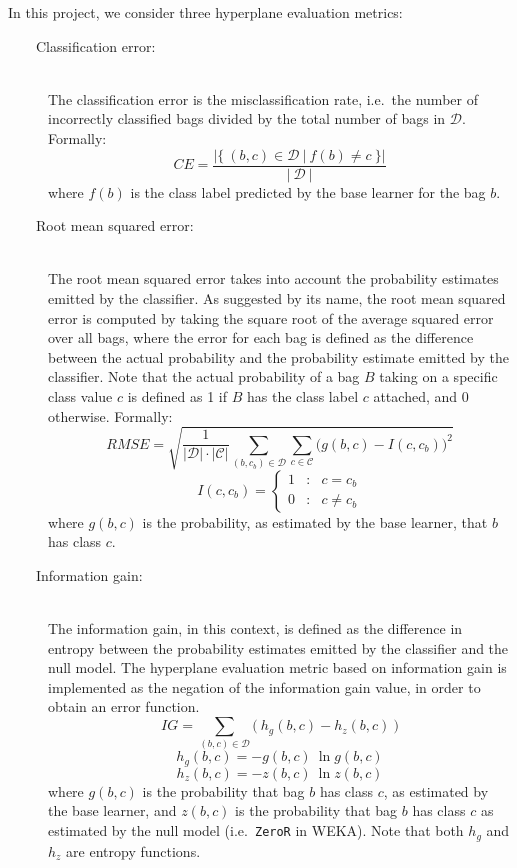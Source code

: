\documentclass[a4paper,12pt]{report} %
\newcommand{\mcl}[1]{\mathcal{#1}}
\begin{document}
In this project, we consider three hyperplane evaluation metrics:
\begin{description}
\item[~~~~Classification error:]  \ \\
	The classification error is the misclassification rate, 
	i.e.\ the number of incorrectly classified bags divided by the total number of bags in $\mcl{D}$.
	Formally:
	$$
		CE = \frac{| \{~ (b,c) \in \mcl{D} ~|~ f(b) \neq c ~\} | }{|~\mcl{D}~|}
	$$
	where $f(b)$ is the class label predicted by the base learner for the bag $b$.\\
	
\item[~~~~Root mean squared error:]  \ \\
	The root mean squared error takes into account the 
	probability estimates emitted by the classifier. 
	As suggested by its name, the root mean squared error is computed by 
		taking the square root of the average squared error over all bags,
		where the error for each bag is defined as the difference between the 
		actual probability and the probability estimate emitted by the classifier.
	Note that the actual probability of a bag $B$ taking on a specific class value $c$ is defined 
		as 1 if $B$ has the class label $c$ attached, and 0 otherwise.
	Formally:
	$$		
		RMSE = \sqrt{\frac{1}{|\mcl{D}| \cdot |\mcl{C}|} 
			\sum_{(b,c_b)\in\mcl{D}} \sum_{c\in\mcl{C}}
			\Big( g(b,c) - I(c,c_b) \Big)^2}
	$$
	$$
		I(c,c_b) = \left\{ 
		\begin{array}{lcr} 
			1 & : & c = c_b \\ 
			0 & : & c \neq c_b 
		\end{array} \right.
	$$
	where $g(b,c)$ is the probability, as estimated by the base learner, that $b$ has class $c$.
		
\item[~~~~Information gain:]  \ \\
	The information gain, in this context, is defined as the difference in entropy
		between the probability estimates emitted by the classifier and the null model.
	The hyperplane evaluation metric based on information gain is implemented 
		as the negation of the information gain value, 
		in order to obtain an error function.		
	$$ IG = \sum_{(b,c)\in\mcl{D}} \Big(~ h_g(b,c) - h_z(b,c)	~\Big) $$
	$$ h_g(b,c) = - g(b,c) ~ \ln g(b,c) $$
	$$ h_z(b,c) = - z(b,c) ~ \ln z(b,c)  $$
	where $g(b,c)$ is the probability that bag $b$ has class $c$, as estimated by the base learner,
	and $z(b,c)$ is the probability that bag $b$ has class $c$ as estimated by the null model 
	(i.e.\ \texttt{ZeroR} in WEKA).
	Note that both $h_g$ and $h_z$ are entropy functions.

\end{description}
\end{document}
